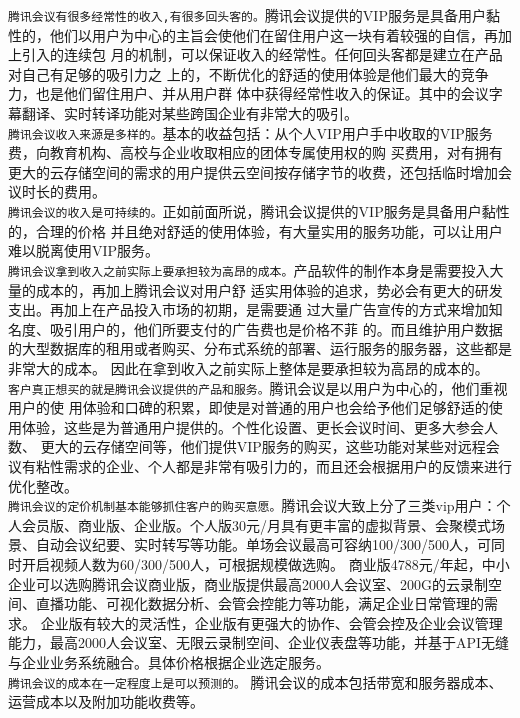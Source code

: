 \documentclass[a4paper,12pt]{article}
\begin{document}
\texttt{腾讯会议有很多经常性的收入,有很多回头客的。}腾讯会议提供的VIP服务是具备⽤户黏性的，他们以⽤户为中⼼的主旨会使他们在留住⽤户这⼀块有着较强的⾃信，再加上引⼊的连续包
⽉的机制，可以保证收⼊的经常性。任何回头客都是建⽴在产品对⾃⼰有⾜够的吸引⼒之
上的，不断优化的舒适的使⽤体验是他们最⼤的竞争⼒，也是他们留住⽤户、并从⽤户群
体中获得经常性收⼊的保证。其中的会议字幕翻译、实时转译功能对某些跨国企业有非常大的吸引。
\\
\texttt{腾讯会议收⼊来源是多样的。}基本的收益包括：从个⼈VIP⽤户⼿中收取的VIP服务费，向教育机构、⾼校与企业收取相应的团体专属使⽤权的购
买费⽤，对有拥有更⼤的云存储空间的需求的⽤户提供云空间按存储字节的收费，还包括临时增加会议时长的费用。
\\
\texttt{腾讯会议的收入是可持续的。}正如前⾯所说，腾讯会议提供的VIP服务是具备⽤户黏性的，合理的价格
并且绝对舒适的使⽤体验，有大量实用的服务功能，可以让⽤户难以脱离使⽤VIP服务。
\\
\texttt{腾讯会议拿到收⼊之前实际上要承担较为⾼昂的成本。}产品软件的制作本身是需要投⼊⼤量的成本的，再加上腾讯会议对⽤户舒
适实⽤体验的追求，势必会有更⼤的研发⽀出。再加上在产品投⼊市场的初期，是需要通
过⼤量⼴告宣传的⽅式来增加知名度、吸引⽤户的，他们所要⽀付的⼴告费也是价格不菲
的。而且维护用户数据的大型数据库的租用或者购买、分布式系统的部署、运行服务的服务器，这些都是非常大的成本。
因此在拿到收⼊之前实际上整体是要承担较为⾼昂的成本的。
\\
\texttt{客户真正想买的就是腾讯会议提供的产品和服务。}腾讯会议是以⽤户为中⼼的，他们重视⽤户的使
⽤体验和⼝碑的积累，即使是对普通的⽤户也会给予他们⾜够舒适的使⽤体验，这些是为普通用户提供的。个性化设置、更⻓会议时间、更多⼤参会⼈数、
更⼤的云存储空间等，他们提供VIP服务的购买，这些功能对某些对远程会议有粘性需求的企业、个人都是非常有吸引力的，而且还会根据用户的反馈来进行优化整改。
\\
\texttt{腾讯会议的定价机制基本能够抓住客户的购买意愿。}腾讯会议大致上分了三类vip用户：个人会员版、商业版、企业版。个人版30元/月具有更丰富的虚拟背景、会聚模式场景、自动会议纪要、实时转写等功能。单场会议最高可容纳100/300/500人，可同时开启视频人数为60/300/500人，可根据规模做选购。
商业版4788元/年起，中小企业可以选购腾讯会议商业版，商业版提供最高2000人会议室、200G的云录制空间、直播功能、可视化数据分析、会管会控能力等功能，满足企业日常管理的需求。
企业版有较大的灵活性，企业版有更强大的协作、会管会控及企业会议管理能力，最高2000人会议室、无限云录制空间、企业仪表盘等功能，并基于API无缝与企业业务系统融合。具体价格根据企业选定服务。
\\
\texttt{腾讯会议的成本在⼀定程度上是可以预测的。}
腾讯会议的成本包括带宽和服务器成本、运营成本以及附加功能收费等。
\end{document}
